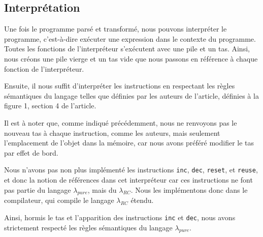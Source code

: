 \documentclass{rapportECL}
\begin{document}



\subsection{Interprétation}

Une fois le programme parsé et transformé, nous pouvons interpréter le programme, c'est-à-dire exécuter une expression dans le 
contexte du programme. Toutes les fonctions de l'interpréteur s'exécutent avec une pile et un tas. Ainsi, nous créons une pile vierge
et un tas vide que nous passons en référence à chaque fonction de l'interpréteur.

Ensuite, il nous suffit d'interpréter les instructions en respectant les règles sémantiques du langage telles que définies par les auteurs de l'article,
définies à la figure 1, section 4 de l'article\cite{ullrich_counting_2020}.



\bigskip


Il est à noter que, comme indiqué précédemment, nous ne renvoyons pas le nouveau tas à chaque instruction, comme les auteurs, 
mais seulement l'emplacement de l'objet dans la mémoire, car nous avons préféré modifier le tas par effet de bord.

Nous n'avons pas non plus implémenté les instructions \verb|inc|, \verb|dec|, \verb|reset|, et \verb|reuse|, et donc la notion de références dans cet interpréteur car ces instructions ne font pas partie du langage $\lambda_{pure}$, mais du $\lambda_{RC}$.
Nous les implémentons donc dans le compilateur, qui compile le langage $\lambda_{RC}$ étendu.

Ainsi, hormis le tas et l'apparition des instructions \verb|inc| et \verb|dec|, nous avons strictement respecté les règles sémantiques du langage $\lambda_{pure}$.
\end{document}
